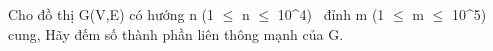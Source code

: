 Cho đồ thị G(V,E) có hướng n (1 $\le$ n $\le$ 10^4)  đỉnh m (1 $\le$ m $\le$ 10^5) cung, Hãy đếm số thành phần liên thông mạnh của G.